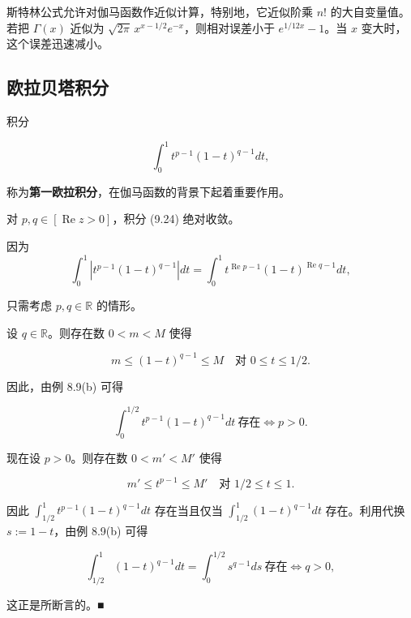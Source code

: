 斯特林公式允许对伽马函数作近似计算，特别地，它近似阶乘 $ n! $ 的大自变量值。若把 $ \Gamma(x) $ 近似为 $ \sqrt{2\pi} \, x^{x-1/2} e^{-x} $，则相对误差小于 $ e^{1/12x} - 1 $。当 $ x $ 变大时，这个误差迅速减小。

\subsection*{欧拉贝塔积分}

积分

\begin{equation}
\int_{0}^{1} t^{p-1} (1-t)^{q-1} dt ,\tag{9.24}
\end{equation}

称为\textbf{第一欧拉积分}，在伽马函数的背景下起着重要作用。

\begin{proposition}

对 $ p, q \in [\operatorname{Re} z > 0] $，积分 (9.24) 绝对收敛。

\proofhead
因为
\[
\int_{0}^{1} \left| t^{p-1} (1-t)^{q-1} \right| dt = \int_{0}^{1} t^{\operatorname{Re} p-1} (1-t)^{\operatorname{Re} q-1} dt ,
\]

只需考虑 $ p, q \in \mathbb{R} $ 的情形。

\begin{subitems}
\item

设 $ q \in \mathbb{R} $。则存在数 $ 0 < m < M $ 使得

\[
m \le (1-t)^{q-1} \le M \quad \text{对 } 0 \le t \le 1/2 .
\]

因此，由例 8.9(b) 可得

\[
\int_{0}^{1/2} t^{p-1} (1-t)^{q-1} dt \ \text{存在} \Longleftrightarrow p > 0 .
\]
\item

现在设 $ p > 0 $。则存在数 $ 0 < m' < M' $ 使得

\[
m' \le t^{p-1} \le M' \quad \text{对 } 1/2 \le t \le 1 .
\]

因此 $ \int_{1/2}^{1} t^{p-1} (1-t)^{q-1} dt $ 存在当且仅当 $ \int_{1/2}^{1} (1-t)^{q-1} dt $ 存在。利用代换 $ s := 1-t $，由例 8.9(b) 可得

\[
\int_{1/2}^{1} (1-t)^{q-1} dt = \int_{0}^{1/2} s^{q-1} ds \ \text{存在} \Longleftrightarrow q > 0 ,
\]

这正是所断言的。\nobreak\hspace{0.35em}■

\end{subitems}

\end{proposition}

